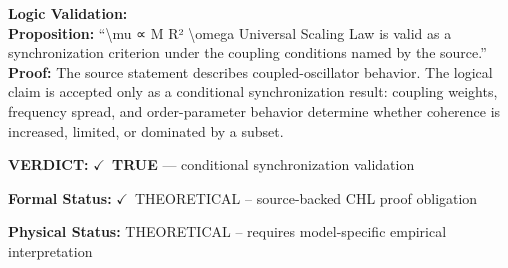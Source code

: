 \textbf{Logic Validation:}\\
\textbf{Proposition:} ``\textbackslash{}mu ∝ M R² \textbackslash{}omega Universal Scaling Law is valid as a synchronization criterion
under the coupling conditions named by the source.''\\
\textbf{Proof:} The source statement describes coupled-oscillator behavior. The logical claim is
accepted only as a conditional synchronization result: coupling weights, frequency
spread, and order-parameter behavior determine whether coherence is increased, limited,
or dominated by a subset.

\textbf{VERDICT:} \ensuremath{\checkmark}\ \textbf{TRUE} --- conditional synchronization validation

\textbf{Formal Status:} \ensuremath{\checkmark}\ THEORETICAL -- source-backed CHL proof obligation

\textbf{Physical Status:} THEORETICAL -- requires model-specific empirical interpretation
\par\vspace{0.45em}
\par
\ifTZPDarkEdition
{}
\fi
\endgroup
\endgroup
